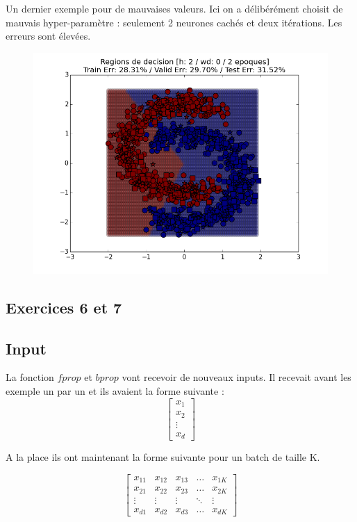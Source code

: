 \documentclass[a4paper,11pt]{article}
\begin{document}
Un dernier exemple pour de mauvaises valeurs. Ici on a délibérément choisit de mauvais hyper-paramètre : seulement 2 neurones cachés et deux itérations. Les erreurs sont élevées.

\begin{figure}[H]
	\includegraphics[width=14cm]{images/exo5-mauvaishyper.png}
	\centering
	\label{fig:comp}
\end{figure}

\subsection{Exercices 6 et 7	}
\subsection{Input}

La fonction $fprop$ et $bprop$ vont recevoir de nouveaux inputs.
Il recevait avant les exemple un par un et ils avaient la forme suivante :
\[
\begin{bmatrix}
    x_{1}  \\
    x_{2}  \\
    \vdots  \\
    x_{d} 
\end{bmatrix}
\]

A la place ils ont maintenant la forme suivante pour un batch de taille K. 

\[
\begin{bmatrix}
    x_{11} & x_{12} & x_{13} & \dots  & x_{1K} \\
    x_{21} & x_{22} & x_{23} & \dots  & x_{2K} \\
    \vdots & \vdots & \vdots & \ddots & \vdots \\
    x_{d1} & x_{d2} & x_{d3} & \dots  & x_{dK}
\end{bmatrix}
\]
\end{document}
